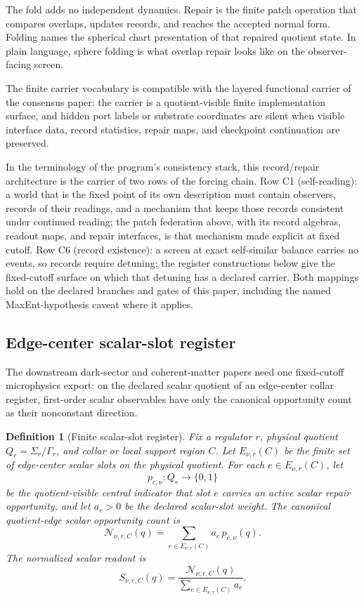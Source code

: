 \documentclass[11pt]{article}
\newtheorem{definition}[theorem]{Definition}
\theoremstyle{remark}
\theoremstyle{plain}
\begin{document}
The fold adds no independent dynamics. Repair is the finite patch operation that compares
overlaps, updates records, and reaches the accepted normal form. Folding names the spherical
chart presentation of that repaired quotient state. In plain language, sphere folding is what
overlap repair looks like on the observer-facing screen.

The finite carrier vocabulary is compatible with the layered functional carrier of the consensus
paper: the carrier is a quotient-visible finite implementation surface, and hidden port labels or
substrate coordinates are silent when visible interface data, record statistics, repair maps, and
checkpoint continuation are preserved.

In the terminology of the program's consistency stack, this record/repair
architecture is the carrier of two rows of the forcing chain. Row C1 (self-reading): a world that
is the fixed point of its own description must contain observers, records of their readings, and
a mechanism that keeps those records consistent under continued reading; the patch federation
above, with its record algebras, readout maps, and repair interfaces, is that mechanism made
explicit at fixed cutoff. Row C6 (record existence): a screen at exact self-similar balance
carries no events, so records require detuning; the register constructions below give the
fixed-cutoff surface on which that detuning has a declared carrier. Both mappings hold on the
declared branches and gates of this paper, including the named MaxEnt-hypothesis caveat where it
applies.

\subsection{Edge-center scalar-slot register}
\label{sec:edge-center-scalar-slot-register}

The downstream dark-sector and coherent-matter papers need one fixed-cutoff
microphysics export: on the declared scalar quotient of an edge-center collar
register, first-order scalar observables have only the canonical opportunity
count as their nonconstant direction.

\begin{definition}[Finite scalar-slot register]\label{def:finite-scalar-slot-register}
Fix a regulator \(r\), physical quotient \(Q_r=\Sigma_r/\Gamma_r\), and collar
or local support region \(C\). Let \(E_{\nu,r}(C)\) be the finite set of
edge-center scalar slots on the physical quotient. For each
\(e\in E_{\nu,r}(C)\), let
\[
p_{e,\nu}:Q_r\to\{0,1\}
\]
be the quotient-visible central indicator that slot \(e\) carries an active
scalar repair opportunity, and let \(a_e>0\) be the declared scalar-slot weight.
The canonical quotient-edge scalar opportunity count is
\[
\mathcal N_{\nu,r,C}(q)
=
\sum_{e\in E_{\nu,r}(C)}a_e\,p_{e,\nu}(q).
\]
The normalized scalar readout is
\[
S_{\nu,r,C}(q)
=
\frac{\mathcal N_{\nu,r,C}(q)}
{\sum_{e\in E_{\nu,r}(C)}a_e}.
\]
\end{definition}
\end{document}
